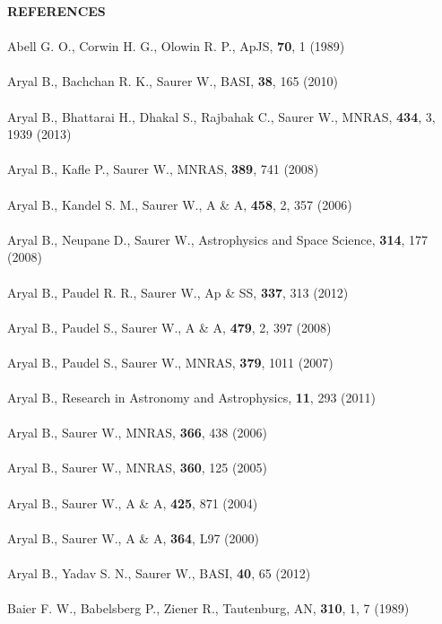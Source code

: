 \thispagestyle{plain} 
 \noindent
{\bf REFERENCES}\\
\\
Abell G. O., Corwin H. G., Olowin R. P., ApJS, \textbf{70}, 1 (1989)\\\\
Aryal B., Bachchan R. K., Saurer W., BASI, \textbf{38}, 165 (2010)\\\\
Aryal B., Bhattarai H., Dhakal S., Rajbahak C., Saurer W., MNRAS, \textbf{434}, 3, 1939 (2013)\\\\
Aryal B., Kafle P., Saurer W., MNRAS, \textbf{389}, 741 (2008)\\\\
Aryal B., Kandel S. M., Saurer W., A \& A, \textbf{458}, 2, 357 (2006)\\\\
Aryal B., Neupane D., Saurer W., Astrophysics and Space Science, \textbf{314}, 177 (2008)\\\\
Aryal B., Paudel R. R., Saurer W., Ap \& SS, \textbf{337}, 313 (2012)\\\\
Aryal B., Paudel S., Saurer W., A \& A, \textbf{479}, 2, 397 (2008)\\\\
Aryal B., Paudel S., Saurer W., MNRAS, \textbf{379}, 1011 (2007)\\\\
Aryal B., Research in Astronomy and Astrophysics, \textbf{11}, 293 (2011)\\\\
Aryal B., Saurer W., MNRAS, \textbf{366}, 438 (2006)\\\\
Aryal B., Saurer W., MNRAS, \textbf{360}, 125 (2005)\\\\
Aryal B., Saurer W., A \& A, \textbf{425}, 871 (2004)\\\\
Aryal B., Saurer W., A \& A, \textbf{364}, L97 (2000)\\\\
Aryal B., Yadav S. N., Saurer W., BASI, \textbf{40}, 65 (2012)\\\\
Baier F. W., Babelsberg P., Ziener R., Tautenburg, AN, \textbf{ 310}, 1, 7 (1989)\\\\
